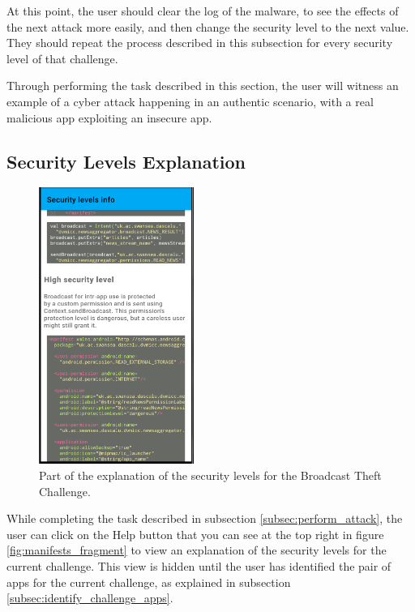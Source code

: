     At this point, the user should clear the log of the malware, to see the effects of the next attack more easily, and then change the security level to the next value. They should repeat the process described in this subsection for every security level of that challenge.
    
    Through performing the task described in this section, the user will witness an example of a cyber attack happening in an authentic scenario, with a real malicious app exploiting an insecure app. 
    
    \subsection{Security Levels Explanation}
        \label{subsec:security_levels_explanation}
        
    \begin{figure}
        \centering
        \includegraphics[width=0.45\textwidth]{graphics/security_level_explanation.PNG}
        \caption{Part of the explanation of the security levels for the Broadcast Theft Challenge.}
        \label{fig:security_levels}
    \end{figure}
        
    While completing the task described in subsection \ref{subsec:perform_attack}, the user can click on the Help button that you can see at the top right in figure \ref{fig:manifests_fragment} to view an explanation of the security levels for the current challenge. This view is hidden until the user has identified the pair of apps for the current challenge, as explained in subsection \ref{subsec:identify_challenge_apps}.
    
